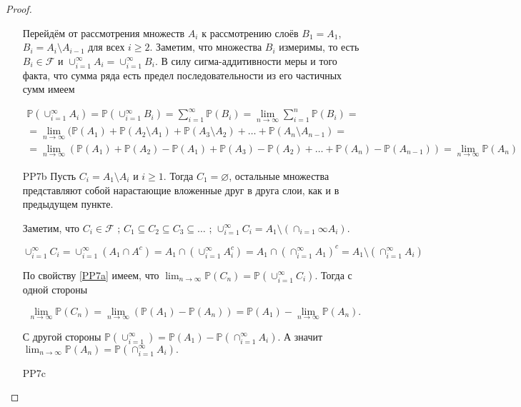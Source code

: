 \documentclass[pdftex, 12pt, a4paper]{article}
\def \mbb{\mathbb}
\def \PP{\mbb{P}}
\def\F{\ensuremath{\mathcal{F}}} %
\renewcommand{\to}{\rightarrow}
\renewcommand{\ge}{\geqslant}
\theoremstyle{definition} %
\numberwithin{problem}{section}
\numberwithin{blits}{section}
\begin{document}
\begin{proof}
\begin{enumerate}
Перейдём от рассмотрения множеств $A_i$ к рассмотрению слоёв $B_1 = A_1$, $B_i = A_i \setminus A_{i-1}$ для всех $i \ge 2 $. Заметим, что множества $B_i$ измеримы, то есть $B_i \in \F$ и $\cup_{i=1}^{\infty} A_i = \cup_{i=1}^{\infty} B_i $. В силу сигма-аддитивности меры и того факта, что сумма ряда есть предел последовательности из его частичных сумм имеем


\begin{multline}
\PP(\cup_{i=1}^{\infty} A_i) = \PP(\cup_{i=1}^{\infty} B_i) = \sum_{i=1}^{\infty} \PP(B_i) = 
\lim_{n \to \infty} \sum_{i=1}^{n} \PP(B_i) = \\ = \lim_{n \to \infty} (\PP(A_1) + \PP(A_2 \setminus A_1) + \PP(A_3 \setminus A_2) + \ldots + \PP(A_n \setminus A_{n-1}) = \\ = \lim_{n \to \infty}(\PP(A_1) + \PP(A_2) - \PP(A_1) + \PP(A_3) - \PP(A_2) + \ldots + \PP(A_n)- \PP(A_{n-1})) = \lim_{n \to \infty} \PP(A_n) 
\end{multline}

\item[PP7b] Пусть $C_i = A_1 \setminus A_i$ и $i \ge 1$. Тогда $C_1 = \varnothing$, остальные множества представляют собой нарастающие вложенные друг в друга слои, как и в предыдущем пункте. 

Заметим, что $C_i \in \F$ ; $C_1 \subseteq C_2 \subseteq C_3 \subseteq \ldots$ ; $\cup_{i=1}^{\infty} C_i = A_1 \setminus (\cap_{i=1}{\infty} A_i)$.

\[ \cup_{i=1}^{\infty} C_i  = \cup_{i=1}^{\infty} (A_1 \cap A^{c}) = A_1 \cap (\cup_{i=1}^{\infty} A_i^{c}) = A_1 \cap (\cap_{i=1}^{\infty} A_1)^{c} = A_1 \setminus (\cap_{i=1}^{\infty} A_i ) \]

По свойству \ref{PP7a} имеем, что $\displaystyle \lim_{n \to \infty} \PP(C_n) = \PP( \cup_{i=1}^{\infty} C_i)$. Тогда с одной стороны 

\[ \lim_{n \to \infty} \PP(C_n) = \lim_{n \to \infty} (\PP(A_1) - \PP(A_n)) = \PP(A_1) - \lim_{n \to \infty} \PP(A_n).\]

С другой стороны $\PP(\cup_{i=1}^{\infty}) = \PP(A_1) - \PP(\cap_{i=1}^{\infty}A_i)$. А значит $\displaystyle \lim_{n \to \infty} \PP(A_n) = \PP( \cap_{i=1}^{\infty} A_i).$

\item[PP7c]
\end{enumerate}
\end{proof}
\end{document}
